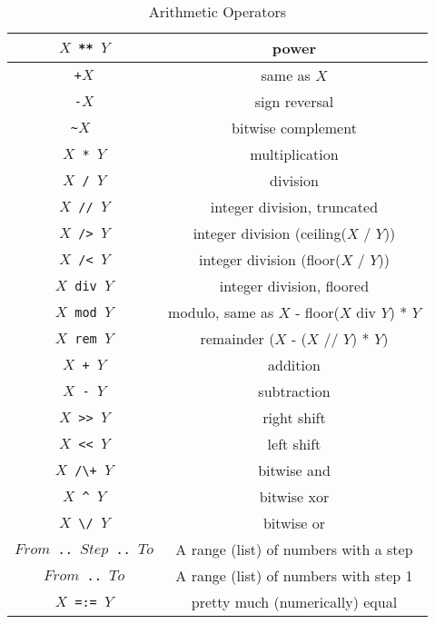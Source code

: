 \begin{table}
\caption{\label{tab:arithdef}Arithmetic Operators}
\begin{center}
\begin{tabular}{ |c|c| } \hline
 \texttt{$X$ ** $Y$}  &  power \\ \hline 
 \texttt{+$X$}      &  same as $X$ \\ \hline
 \texttt{-$X$}      &  sign reversal \\ \hline 
 {\tt \verb+~+$X$ }  &   bitwise complement \\ \hline 
 \texttt{$X$ * $Y$} &    multiplication \\ \hline 
 \texttt{$X$ / $Y$} &    division \\ \hline 
 \texttt{$X$ // $Y$} &    integer division, truncated \\ \hline 
 \texttt{$X$ /> $Y$}  &  integer division (ceiling($X$ / $Y$)) \\ \hline
 \texttt{$X$ /< $Y$}  &  integer division (floor($X$ / $Y$)) \\ \hline
 \texttt{$X$ div $Y$} &   integer division, floored \\ \hline
 \texttt{$X$ mod $Y$} &   modulo, same as $X$ - floor($X$ div $Y$) * $Y$ \\ \hline 
 \texttt{$X$ rem $Y$} &  remainder ($X$ - ($X$ // $Y$) * $Y$) \\ \hline 
 \texttt{$X$ + $Y$} & addition \\ \hline 
 \texttt{$X$ - $Y$} &   subtraction \\ \hline 
 \texttt{$X$ >> $Y$}  &  right shift \\ \hline 
 \texttt{$X$ << $Y$}  &  left shift \\ \hline 
 {\tt $X$ \verb+/\+ $Y$}  &   bitwise and \\ \hline 
 {\tt $X$ \verb+^+ $Y$} &   bitwise xor \\ \hline
 {\tt $X$ \verb+\/+ $Y$}  &   bitwise or \\ \hline 
 {\tt $From$ \verb+..+ $Step$ \verb+..+ $To$}  &   A range (list) of numbers with a step \\ \hline 
 {\tt $From$ \verb+..+ $To$}  &   A range (list) of numbers with step 1 \\ \hline
 {\tt $X$ \verb+=:=+ $Y$}  &   pretty much (numerically) equal \\ \hline
\end{tabular}
\end{center}
\end{table}

